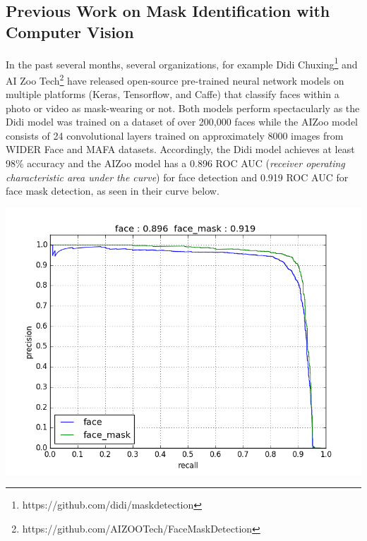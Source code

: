 \documentclass[conference, 12pt, onecolumn]{IEEEtran}
\begin{document}
\subsection{Previous Work on Mask Identification with Computer Vision}
In the past several months, several organizations, for example Didi Chuxing\footnote{https://github.com/didi/maskdetection} and AI Zoo Tech\footnote{https://github.com/AIZOOTech/FaceMaskDetection} have released open-source pre-trained neural network models on multiple platforms (Keras, Tensorflow, and Caffe) that classify faces within a photo or video as mask-wearing or not. Both models perform spectacularly as the Didi model was trained on a dataset of over 200,000 faces while the AIZoo model consists of 24 convolutional layers trained on approximately 8000 images from WIDER Face and MAFA datasets. Accordingly, the Didi model achieves at least 98\% accuracy and the AIZoo model has a 0.896 ROC AUC (\textit{receiver operating characteristic area under the curve}) for face detection and 0.919 ROC AUC for face mask detection, as seen in their curve below.
\begin{center}
\includegraphics[scale=.5]{pr_curve}
\end{center}


\end{document}
